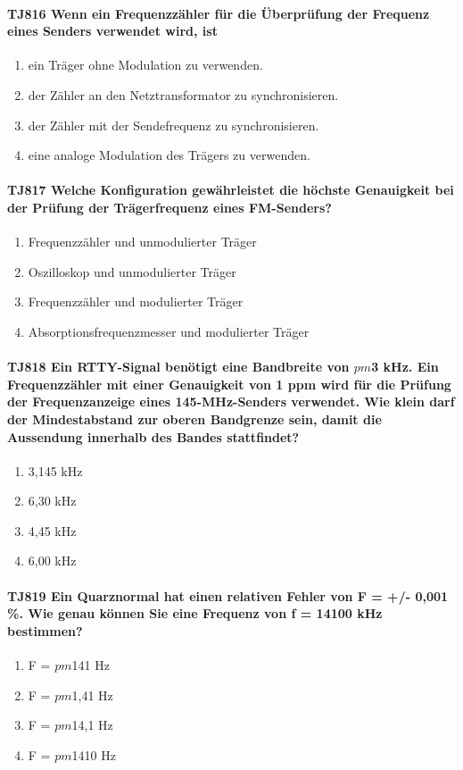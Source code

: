 \documentclass[8pt]{article}
\begin{document}
\paragraph*{TJ816 Wenn ein Frequenzzähler für die Überprüfung der Frequenz eines Senders verwendet wird, ist} 
\begin{enumerate}[nolistsep,label=\Alph*]
\item ein Träger ohne Modulation zu verwenden.
\item der Zähler an den Netztransformator zu synchronisieren.
\item der Zähler mit der Sendefrequenz zu synchronisieren.
\item eine analoge Modulation des Trägers zu verwenden.
\end{enumerate}

\paragraph*{TJ817 Welche Konfiguration gewährleistet die höchste Genauigkeit bei der Prüfung der Trägerfrequenz eines FM-Senders?}
\begin{enumerate}[nolistsep,label=\Alph*]
\item Frequenzzähler und unmodulierter Träger
\item Oszilloskop und unmodulierter Träger
\item Frequenzzähler und modulierter Träger
\item Absorptionsfrequenzmesser und modulierter Träger
\end{enumerate}

\paragraph*{TJ818 Ein RTTY-Signal benötigt eine Bandbreite von $pm$3 kHz. Ein Frequenzzähler mit einer Genauigkeit von 1 ppm wird für die Prüfung der Frequenzanzeige eines 145-MHz-Senders verwendet. Wie klein darf der Mindestabstand zur oberen Bandgrenze sein, damit die Aussendung innerhalb des Bandes stattfindet?}
\begin{enumerate}[nolistsep,label=\Alph*]
\item 3,145 kHz
\item 6,30 kHz
\item 4,45 kHz
\item 6,00 kHz
\end{enumerate}

\paragraph*{TJ819 Ein Quarznormal hat einen relativen Fehler von F = +/- 0,001 \%. Wie genau können Sie eine Frequenz von f = 14100 kHz bestimmen?} 
\begin{enumerate}[nolistsep,label=\Alph*]
\item F = $pm$141 Hz
\item F = $pm$1,41 Hz
\item F = $pm$14,1 Hz
\item F = $pm$1410 Hz
\end{enumerate}
\end{document}
